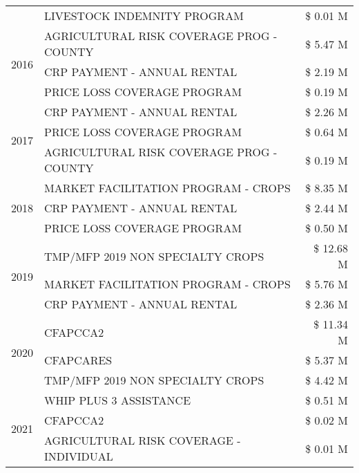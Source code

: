\begin{tabular}{llr}
 & LIVESTOCK INDEMNITY PROGRAM & \$ 0.01 M \\
\cline{1-3}
\multirow[t]{3}{*}{2016} & AGRICULTURAL RISK COVERAGE PROG - COUNTY      & \$ 5.47 M \\
 & CRP PAYMENT - ANNUAL RENTAL                   & \$ 2.19 M \\
 & PRICE LOSS COVERAGE PROGRAM                   & \$ 0.19 M \\
\cline{1-3}
\multirow[t]{3}{*}{2017} & CRP PAYMENT - ANNUAL RENTAL & \$ 2.26 M \\
 & PRICE LOSS COVERAGE PROGRAM & \$ 0.64 M \\
 & AGRICULTURAL RISK COVERAGE PROG - COUNTY & \$ 0.19 M \\
\cline{1-3}
\multirow[t]{3}{*}{2018} & MARKET FACILITATION PROGRAM - CROPS & \$ 8.35 M \\
 & CRP PAYMENT - ANNUAL RENTAL & \$ 2.44 M \\
 & PRICE LOSS COVERAGE PROGRAM & \$ 0.50 M \\
\cline{1-3}
\multirow[t]{3}{*}{2019} & TMP/MFP 2019 NON SPECIALTY CROPS & \$ 12.68 M \\
 & MARKET FACILITATION PROGRAM - CROPS & \$ 5.76 M \\
 & CRP PAYMENT - ANNUAL RENTAL & \$ 2.36 M \\
\cline{1-3}
\multirow[t]{3}{*}{2020} & CFAPCCA2 & \$ 11.34 M \\
 & CFAPCARES & \$ 5.37 M \\
 & TMP/MFP 2019 NON SPECIALTY CROPS & \$ 4.42 M \\
\cline{1-3}
\multirow[t]{3}{*}{2021} & WHIP PLUS 3 ASSISTANCE & \$ 0.51 M \\
 & CFAPCCA2 & \$ 0.02 M \\
 & AGRICULTURAL RISK COVERAGE - INDIVIDUAL & \$ 0.01 M \\
\cline{1-3}
\bottomrule
\end{tabular}
